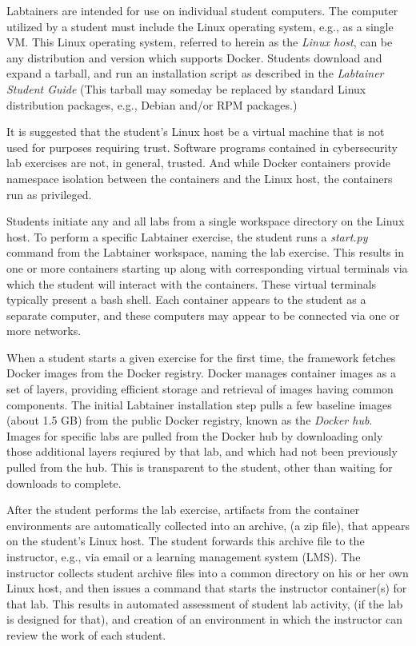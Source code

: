 \documentclass[12pt]{article}
\begin{document}
Labtainers are intended for use on individual student computers.
The computer utilized by a student must include the Linux operating system, e.g.,
as a single VM.  This Linux operating system, referred to herein
as the \textit{Linux host}, can be any distribution and version
which supports Docker.  Students download and expand a tarball, and run
an installation script as described in the \textit{Labtainer Student Guide}
(This tarball may someday be replaced by standard Linux distribution packages,
e.g., Debian and/or RPM packages.)  

It is suggested that the student's Linux host be a virtual machine that is
not used for purposes requiring trust.  Software programs contained in cybersecurity lab
exercises are not, in general, trusted.  And while Docker containers provide namespace
isolation between the containers and the Linux host, the containers run as privileged.

Students initiate any and all labs from a
single workspace directory on the Linux host.
To perform a specific Labtainer exercise, the student runs a \textit{start.py} command from
the Labtainer workspace, naming the lab exercise.  This results in one or more
containers starting up along with corresponding virtual terminals via which the 
student will interact with the containers.  These virtual terminals typically
present a bash shell.  Each container appears to the student as a separate
computer, and these computers may appear to be connected via one or more networks.  

When a student starts a given exercise for the first time, the framework fetches
Docker images from the Docker registry.  Docker manages container images as a set of
layers, providing efficient storage and retrieval of images having common components.
The initial Labtainer installation step pulls a few baseline images (about 1.5 GB) from 
the public
Docker registry, known as the \textit{Docker hub}.  Images for specific labs are pulled
from the Docker hub by downloading only those additional layers reqiured by that lab, and
which had not been previously pulled from the hub.  This is transparent to
the student, other than waiting for downloads to complete.

After the student performs the lab exercise, artifacts from the container
environments are automatically collected into an archive, (a zip file), that appears on
the student's Linux host.  The student forwards this archive file to the instructor,
e.g., via email or a learning management system (LMS).  The instructor collects student archive files into a common
directory on his or her own Linux host, and then issues a command that starts
the instructor container(s) for that lab.  This results in automated assessment of student lab
activity, (if the lab is designed for that), and creation of an environment
in which the instructor can review the work of each student.
\end{document}
